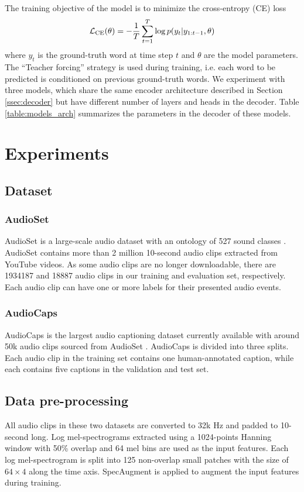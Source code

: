 \documentclass{article}
\begin{document}
\begin{sloppy}
The training objective of the model is to minimize the cross-entropy (CE) loss
\begin{equation}
  \label{eqn:ce_loss}
  \mathcal L_{\rm CE}(\theta)= - \frac{1}{T} \sum_{t=1}^T \log{p(y_t|y_{1:t-1},\theta)}
\end{equation}
where $y_t$ is the ground-truth word at time step $t$ and $\theta$ are the model parameters. The ``Teacher forcing'' strategy is used during training, i.e. each word to be predicted is conditioned on previous ground-truth words. We experiment with three models, which share the same encoder architecture described in Section \ref{ssec:decoder} but have different number of layers and heads in the decoder. Table \ref{table:models_arch} summarizes the parameters in the decoder of these models.

\section{Experiments}
\label{sec:exp}
\subsection{Dataset}
\label{ssec:dataset}

\subsubsection{AudioSet}
\label{sssec:audioset}
AudioSet is a large-scale audio dataset with an ontology of 527 sound classes \cite{audioset}. AudioSet contains more than \num{2} million 10-second audio clips extracted from YouTube videos. As some audio clips are no longer downloadable, there are \num{1934187} and \num{18887} audio clips in our training and evaluation set, respectively. Each audio clip can have one or more labels for their presented audio events.

\subsubsection{AudioCaps}
\label{ssec:audiocaps}
AudioCaps is the largest audio captioning dataset currently available with around 50k audio clips sourced from AudioSet \cite{kim2019audiocaps}. AudioCaps is divided into three splits. Each audio clip in the training set contains one human-annotated caption, while each contains five captions in the validation and test set. 


\subsection{Data pre-processing}
\label{ssec:dat_preprocess}
All audio clips in these two datasets are converted to 32k Hz and padded to 10-second long. Log mel-spectrograms extracted using a \num{1024}-points Hanning window with \num{50}\% overlap and \num{64} mel bins are used as the input features. Each log mel-spectrogram is split into \num{125} non-overlap small patches with the size of $64 \times 4$ along the time axis. SpecAugment \cite{park2019specaugment} is applied to augment the input features during training. 


\end{sloppy}
\end{document}

